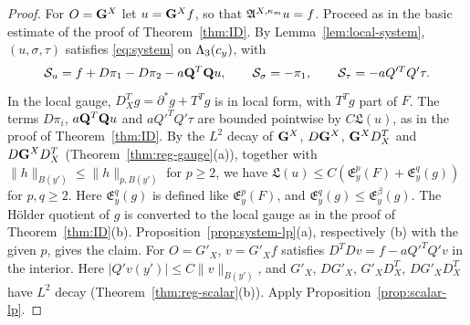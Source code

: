 \begin{proof}
For $O=\mathbf G^X$ let $u=\mathbf G^Xf$, so that $\mathfrak A^{X,\kappa_m}u=f$. Proceed as in the basic estimate of the proof of Theorem~\ref{thm:ID}. By Lemma~\ref{lem:local-system}, $(u,\sigma,\tau)$ satisfies \eqref{eq:system} on $\Lambda_3(c_y)$, with
\[
\mathcal S_u=f+D\pi_1-D\pi_2-a\mathbf Q^T\mathbf Q u,\qquad\mathcal S_\sigma=-\pi_1,\qquad\mathcal S_\tau=-aQ'^TQ'\tau .
\]
In the local gauge, $D^T_Xg=\partial^*g+T^Tg$ is in local form, with $T^Tg$ part of $F$. The terms $D\pi_i$, $a\mathbf Q^T\mathbf Q u$ and $aQ'^TQ'\tau$ are bounded pointwise by $C\mathfrak L(u)$, as in the proof of Theorem~\ref{thm:ID}. By the $L^2$ decay of $\mathbf G^X$, $D\mathbf G^X$, $\mathbf G^XD^T_X$ and $D\mathbf G^XD^T_X$ (Theorem~\ref{thm:reg-gauge}(a)), together with $\|h\|_{B(y')}\le\|h\|_{p,B(y')}$ for $p\ge2$, we have $\mathfrak L(u)\le C(\mathfrak E^p_y(F)+\mathfrak E^q_y(g))$ for $p,q\ge2$. Here $\mathfrak E^q_y(g)$ is defined like $\mathfrak E^p_y(F)$, and $\mathfrak E^q_y(g)\le\mathfrak E^\beta_y(g)$. The H\"older quotient of $g$ is converted to the local gauge as in the proof of Theorem~\ref{thm:ID}(b). Proposition~\ref{prop:system-lp}(a), respectively (b) with the given $p$, gives the claim. For $O=G'_X$, $v=G'_Xf$ satisfies $D^TDv=f-aQ'^TQ'v$ in the interior. Here $|Q'v(y')|\le C\|v\|_{B(y')}$, and $G'_X$, $DG'_X$, $G'_XD^T_X$, $DG'_XD^T_X$ have $L^2$ decay (Theorem~\ref{thm:reg-scalar}(b)). Apply Proposition~\ref{prop:scalar-lp}.
\end{proof}

